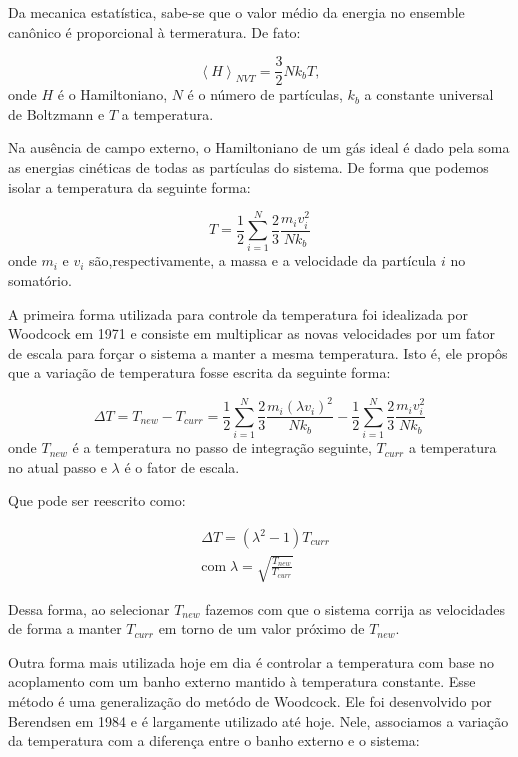 Da mecanica estatística, sabe-se que o valor médio da energia no ensemble canônico é proporcional à termeratura\cite{Leach2001}.
De fato:

\begin{equation}
{\left< {H} \right>}_{NVT} = \frac{3}{2}Nk_bT ,
\end{equation}
onde $H$ é o Hamiltoniano, $N$ é o número de partículas, $k_b$ a constante universal de Boltzmann e $T$ a temperatura.

Na ausência de campo externo, o Hamiltoniano de um gás ideal é dado pela soma as energias cinéticas de todas as partículas do sistema.
De forma que podemos isolar a temperatura da seguinte forma:

\begin{equation}
T=\frac{1}{2} \sum_{i=1}^{N} {\frac{2}{3}\frac{m_i v_i^2}{Nk_b}}
\end{equation}
onde $m_i$ e $v_i$ são,respectivamente, a massa e a velocidade da partícula $i$ no somatório.

A primeira forma utilizada para controle da temperatura foi idealizada por Woodcock\cite{Woodcock1971} em 1971 e consiste em multiplicar as novas velocidades por um fator de escala para forçar o sistema a manter a mesma temperatura.
Isto é, ele propôs que a variação de temperatura fosse escrita da seguinte forma:

\begin{equation}
\Delta T = T_{new} - T_{curr}=\frac{1}{2} \sum_{i=1}^{N} {\frac{2}{3}\frac{m_i (\lambda v_i)^2}{Nk_b}} - \frac{1}{2} \sum_{i=1}^{N} {\frac{2}{3}\frac{m_i v_i^2}{Nk_b}}
\end{equation}
onde $T_{new}$ é a temperatura no passo de integração seguinte, $T_{curr}$ a temperatura no atual passo e $\lambda$ é o fator de escala.

Que pode ser reescrito como:

\begin{equation}
\begin{aligned}
&\Delta T = (\lambda ^2 - 1) T_{curr}\\
&\text{com} \; \lambda =  \sqrt{\frac{T_{new}}{T_{curr}}}
\end{aligned}
\end{equation}

Dessa forma, ao selecionar $T_{new}$ fazemos com que o sistema corrija as velocidades de forma a manter $T_{curr}$ em torno de um valor próximo de $T_{new}$.

Outra forma mais utilizada hoje em dia é controlar a temperatura com base no acoplamento com um banho externo mantido à temperatura constante.
Esse método é uma generalização do metódo de Woodcock\cite{Woodcock1971}.
Ele foi desenvolvido por Berendsen\cite{Berendsen1984} em 1984 e é largamente utilizado até hoje.
Nele, associamos a variação da temperatura com a diferença entre o banho externo e o sistema:

